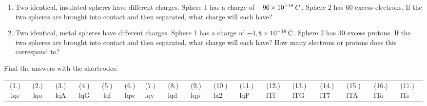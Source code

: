 \begin{enumerate}[noitemsep, label=\textbf{\arabic*}. ]
            \item Two identical, insulated spheres have different charges. Sphere 1 has a charge of 
$-96\ensuremath{\times}{10}^{-18}\phantom{\rule{2pt}{0ex}}C$. Sphere 2 has 60 excess electrons. If the two spheres are brought into contact and then separated, what charge will each have? \newline
            \item Two identical, metal spheres have different charges. Sphere 1 has a charge of 
$-4,8\ensuremath{\times}{10}^{-18}\phantom{\rule{2pt}{0ex}}\mathrm{C}$. Sphere 2 has 30 excess protons. If the two spheres are brought into contact and then separated, what charge will each have? How many electrons or protons does this correspond to?\newline
            \end{enumerate}
  \label{m38781**end}
  \label{464e844ca5615087ea89d9d95dd9a43a**end}
\par {} Find the answers with the shortcodes:
 \par \begin{tabular}[h]{cccccc}
 (1.) lqs  &  (2.) lqo  &  (3.) lqA  &  (4.) lqG  &  (5.) lqf  &  (6.) lqw  &  (7.) lqv  &  (8.) lqd  &  (9.) lqp  &  (10.) la2  &  (11.) lqP  &  (12.) lTf  &  (13.) lTG  &  (14.) lT7  &  (15.) lTA  &  (16.) lTo  &  (17.) lTs  & \end{tabular}
